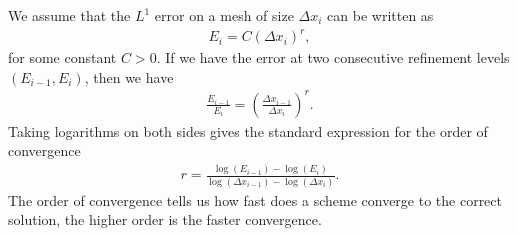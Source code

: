 We assume that the $L^{1}$ error on a mesh of size $\Delta x_i$ can be written as
\begin{align*}
    E_i = C(\Delta x_i)^r,
\end{align*}
for some constant $C>0$.
If we have the error at two consecutive refinement levels $(E_{i-1},E_i)$, then we have
\begin{align*}
    \frac{E_{i-1}}{E_i}
    =\left(\frac{\Delta x_{i-1}}{\Delta x_i}\right)^{r}.
\end{align*}
Taking logarithms on both sides gives the standard expression for the order of convergence
\begin{align*}
    r =
    \frac{\log(E_{i-1}) - \log(E_i)}
    {\log(\Delta x_{i-1}) - \log(\Delta x_i)}.
\end{align*}
The order of convergence tells us how fast does a scheme converge to the correct solution, the higher order is the faster convergence.

